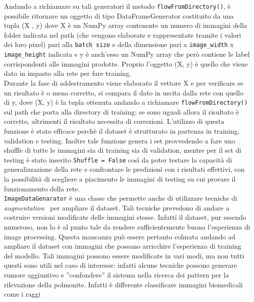  Andando a richiamare su tali generatori il metodo  
 \lstinline{flowFromDirectory()}, è possibile ritornare un oggetto di tipo DataFrameGenerator
 costituito da una tupla (X , y) dove X è un NumPy array contenente un numero di immagini della folder indicata nel path (che vengono elaborate e rappresentate tramite i valori dei loro pixel) 
 pari alla 
   \lstinline{batch size} e della dimensione pari a  \lstinline{image_width} x \lstinline{image_height} indicata e 
   y è anch’esso
    un NumPy array che però contiene le label corrispondenti alle immagini prodotte. Proprio l'oggetto (X, y) è quello che viene dato in impasto alla rete per fare training.\\
     Durante la fase di addestramento
    viene elaborato il vettore X e per verificare se un risultato è o meno
    corretto, si compara il dato in uscita dalla rete con quello di y, dove (X, y) è la tupla ottenuta andando 
    a richiamare \lstinline{flowFromDirectory()} sul path che porta alla directory di training: se
    sono uguali allora il risultato è corretto, altrimenti il risultato necessita di
    correzioni.  L'utilizzo di
     questa funzione è stato efficace perchè il dataset è strutturato in partenza in training, 
     validation e testing. Inoltre tale funzione genera i set provvedendo a fare uno shuffle di tutte le immagini
      sia di training sia di  validation, mentre per il set di testing è stato inserito  \lstinline{Shuffle = False}
       così da poter testare la capacità di generalizzazione della rete e confrontare le predizioni con i risultati 
       effettivi, con la possibilità di scegliere a piacimento le immagini di testing su cui provare il funzionamento della rete. \\
 \lstinline{ImageDataGenarator} è una classe che permette anche di utilizzare tecniche di \emph{augmentation}~\cite{augpneum}
  per ampliare il dataset. Tali tecniche prevedono di andare a costruire versioni modificate delle immagini stesse. 
  Infatti il dataset, pur essendo numeroso, non lo è al punto tale da rendere sufficientemente buona l’esperienza
   di image processing. Questa mancanza può essere pertanto colmata andando ad ampliare il dataset con immagini
    che possano arricchire l’esperienza di training del modello. Tali immagini possono essere modificate in vari
     modi, ma non tutti questi sono utili nel caso di interesse: infatti alcune tecniche possono generare rumore 
     aggiuntivo e ''confondere'' il sistema nella ricerca dei pattern per la rilevazione della polmonite.
     Infatti è differente classificare immagini biomedicali come i raggi
